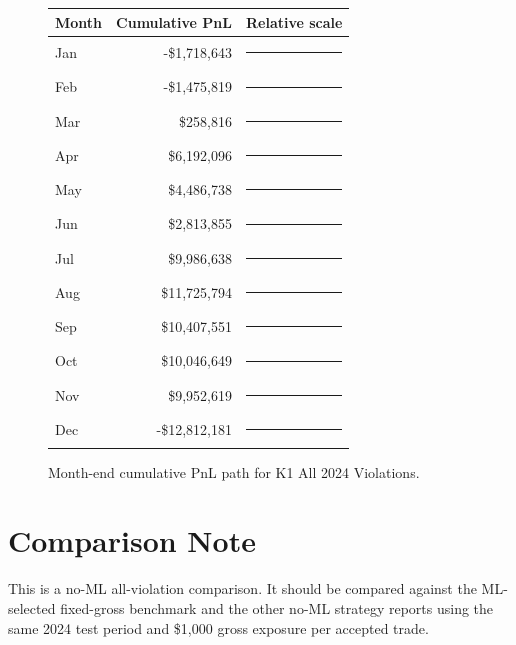 \documentclass[11pt]{article}
\begin{document}
\begin{figure}[h]
\centering
\begin{tabular}{@{}lrl@{}}
\toprule
Month & Cumulative PnL & Relative scale \\
\midrule
Jan & -\$1,718,643 & \textcolor{red}{\rule{1.3cm}{7pt}}\\
Feb & -\$1,475,819 & \textcolor{red}{\rule{1.2cm}{7pt}}\\
Mar & \$258,816 & \textcolor{green!50!black}{\rule{0.2cm}{7pt}}\\
Apr & \$6,192,096 & \textcolor{green!50!black}{\rule{4.8cm}{7pt}}\\
May & \$4,486,738 & \textcolor{green!50!black}{\rule{3.5cm}{7pt}}\\
Jun & \$2,813,855 & \textcolor{green!50!black}{\rule{2.2cm}{7pt}}\\
Jul & \$9,986,638 & \textcolor{green!50!black}{\rule{7.8cm}{7pt}}\\
Aug & \$11,725,794 & \textcolor{green!50!black}{\rule{9.2cm}{7pt}}\\
Sep & \$10,407,551 & \textcolor{green!50!black}{\rule{8.1cm}{7pt}}\\
Oct & \$10,046,649 & \textcolor{green!50!black}{\rule{7.8cm}{7pt}}\\
Nov & \$9,952,619 & \textcolor{green!50!black}{\rule{7.8cm}{7pt}}\\
Dec & -\$12,812,181 & \textcolor{red}{\rule{10.0cm}{7pt}}\\
\bottomrule
\end{tabular}
\caption{Month-end cumulative PnL path for K1 All 2024 Violations.}
\end{figure}

\section{Comparison Note}

This is a no-ML all-violation comparison. It should be compared against the ML-selected fixed-gross benchmark and the other no-ML strategy reports using the same 2024 test period and \$1,000 gross exposure per accepted trade.
\end{document}
